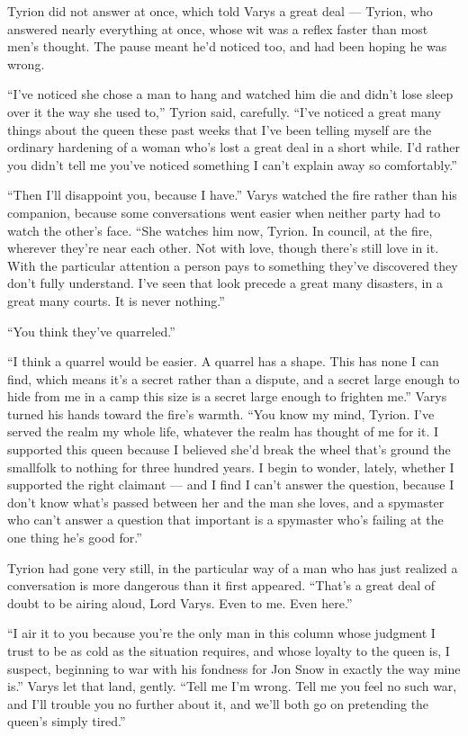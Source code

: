Tyrion did not answer at once, which told Varys a great deal — Tyrion, who answered nearly everything at once, whose wit was a reflex faster than most men’s thought. The pause meant he’d noticed too, and had been hoping he was wrong.

“I’ve noticed she chose a man to hang and watched him die and didn’t lose sleep over it the way she used to,” Tyrion said, carefully. “I’ve noticed a great many things about the queen these past weeks that I’ve been telling myself are the ordinary hardening of a woman who’s lost a great deal in a short while. I’d rather you didn’t tell me you’ve noticed something I can’t explain away so comfortably.”

“Then I’ll disappoint you, because I have.” Varys watched the fire rather than his companion, because some conversations went easier when neither party had to watch the other’s face. “She watches him now, Tyrion. In council, at the fire, wherever they’re near each other. Not with love, though there’s still love in it. With the particular attention a person pays to something they’ve discovered they don’t fully understand. I’ve seen that look precede a great many disasters, in a great many courts. It is never nothing.”

\sceneBreak

“You think they’ve quarreled.”

“I think a quarrel would be easier. A quarrel has a shape. This has none I can find, which means it’s a secret rather than a dispute, and a secret large enough to hide from me in a camp this size is a secret large enough to frighten me.” Varys turned his hands toward the fire’s warmth. “You know my mind, Tyrion. I’ve served the realm my whole life, whatever the realm has thought of me for it. I supported this queen because I believed she’d break the wheel that’s ground the smallfolk to nothing for three hundred years. I begin to wonder, lately, whether I supported the right claimant — and I find I can’t answer the question, because I don’t know what’s passed between her and the man she loves, and a spymaster who can’t answer a question that important is a spymaster who’s failing at the one thing he’s good for.”

Tyrion had gone very still, in the particular way of a man who has just realized a conversation is more dangerous than it first appeared. “That’s a great deal of doubt to be airing aloud, Lord Varys. Even to me. Even here.”

“I air it to you because you’re the only man in this column whose judgment I trust to be as cold as the situation requires, and whose loyalty to the queen is, I suspect, beginning to war with his fondness for Jon Snow in exactly the way mine is.” Varys let that land, gently. “Tell me I’m wrong. Tell me you feel no such war, and I’ll trouble you no further about it, and we’ll both go on pretending the queen’s simply tired.”

